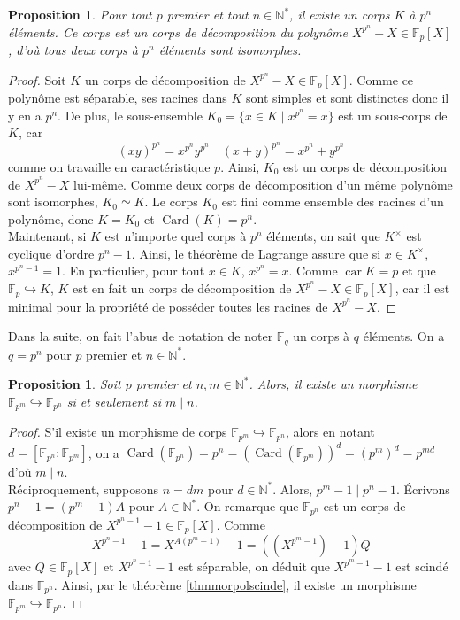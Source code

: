 \documentclass{article}
\newcommand{\N}{\mathbb{N}}
\newcommand{\F}{\mathbb{F}}
\DeclareMathOperator{\Card}{Card}
\DeclareMathOperator{\car}{car}
\theoremstyle{plain}
\newtheorem{proposition}[theorem]{Proposition}
\theoremstyle{definition}
\theoremstyle{remark}
\begin{document}
\begin{proposition}
    Pour tout $p$ premier et tout $n \in \N^*$, il existe un corps $K$ à $p^n$ éléments. Ce corps est un corps de décomposition du polynôme $X^{p^n} - X \in \F_p [X]$, d'où tous deux corps à $p^n$ éléments sont isomorphes.
\end{proposition}

\begin{proof}
    Soit $K$ un corps de décomposition de $X^{p^n} - X \in \F_p [X]$. Comme ce polynôme est séparable, ses racines dans $K$ sont simples et sont distinctes donc il y en a $p^n$. De plus, le sous-ensemble $K_0 = \{ x\in K \mid x^{p^n} = x\}$ est un sous-corps de $K$, car
    \[(xy)^{p^n} = x^{p^n} y^{p^n} \quad (x+y)^{p^n} = x^{p^n}+y^{p^n}\]
    comme on travaille en caractéristique $p$. Ainsi, $K_0$ est un corps de décomposition de $X^{p^n} - X$ lui-même. Comme deux corps de décomposition d'un même polynôme sont isomorphes, $K_0 \simeq K$. Le corps $K_0$ est fini comme ensemble des racines d'un polynôme, donc $K = K_0$ et $\Card(K) = p^n$. \\
    Maintenant, si $K$ est n'importe quel corps à $p^n$ éléments, on sait que $K^\times$ est cyclique d'ordre $p^n - 1$. Ainsi, le théorème de Lagrange assure que si $x \in K^\times$, $x^{p^n - 1} = 1$. En particulier, pour tout $x \in K$, $x^{p^n} = x$. Comme $\car K = p$ et que $\F_p \hookrightarrow K$, $K$ est en fait un corps de décomposition de $X^{p^n} - X \in \F_p[X]$, car il est minimal pour la propriété de posséder toutes les racines de $X^{p^n} - X$.
\end{proof}

Dans la suite, on fait l'abus de notation de noter $\F_q$ un corps à $q$ éléments. On a $q=p^n$ pour $p$ premier et $n\in \N^*$.

\begin{proposition}
    Soit $p$ premier et $n,m \in \N^*$. Alors, il existe un morphisme $\F_{p^m} \hookrightarrow \F_{p^n}$ si et seulement si $m \mid n$.
\end{proposition}

\begin{proof}
    S'il existe un morphisme de corps $\F_{p^m} \hookrightarrow \F_{p^n}$, alors en notant $d = [\F_{p^n} : \F_{p^m}]$, on a $\Card(\F_{p^n}) = p^n = (\Card(\F_{p^m}))^d = (p^m)^d = p^{md}$ d'où $m \mid n$. \\
    Réciproquement, supposons $n = dm$ pour $d \in \N^*$. Alors, $p^m - 1 \mid p^n - 1$. Écrivons $p^n - 1 = (p^m - 1)A$ pour $A \in \N^*$. On remarque que $\F_{p^n}$ est un corps de décomposition de $X^{p^n - 1} - 1 \in \F_p [X]$. Comme
    \[X^{p^n - 1} - 1 = X^{A(p^m - 1)} - 1 = ((X^{p^m - 1}) - 1)Q\]
    avec $Q \in \F_p [X]$ et $X^{p^n - 1} - 1$ est séparable, on déduit que $X^{p^m - 1} - 1$ est scindé dans $\F_{p^n}$. Ainsi, par le théorème \ref{thmmorpolscinde}, il existe un morphisme $\F_{p^m} \hookrightarrow \F_{p^n}$.
\end{proof}
\end{document}
